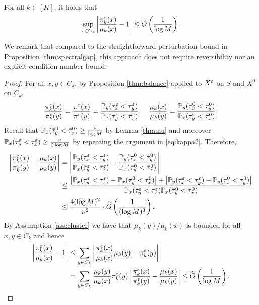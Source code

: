 \begin{cor}\label{thm:pimu}
For all $k\in[K]$, it holds that
\begin{equation*}
\sup_{x\in C_k} \left\lvert\frac{\pi_k^\varepsilon(x)}{\mu_k(x)} - 1\right\rvert\le \widetilde{O}\left(\frac{1}{\log M}\right).
\end{equation*}
\end{cor}
We remark that compared to the straightforward perturbation bound in Proposition \ref{thm:spectralgap}, this approach does not require reversibility nor an explicit condition number bound.
\begin{proof}
For all $x,y\in C_k$, by Proposition \ref{thm:balance} applied to $X^\varepsilon$ on $S$ and $X^0$ on $C_k$,
\begin{equation*}
\frac{\pi_k^\varepsilon(x)}{\pi_k^\varepsilon(y)} = \frac{\pi^\varepsilon(x)}{\pi^\varepsilon(y)} = \frac{\mathbb{P}_y(\bar{\tau}_x^\varepsilon<\bar{\tau}_y^\varepsilon)}{\mathbb{P}_x(\bar{\tau}_y^\varepsilon<\bar{\tau}_x^\varepsilon)},\quad \frac{\mu_k(x)}{\mu_k(y)} = \frac{\mathbb{P}_y(\bar{\tau}_x^0<\bar{\tau}_y^0)}{\mathbb{P}_x(\bar{\tau}_y^0<\bar{\tau}_x^0)}.
\end{equation*}
Recall that $\mathbb{P}_x(\bar{\tau}_y^0<\bar{\tau}_x^0) \ge \frac{\nu}{\log M}$ by Lemma \ref{thm:nu} and moreover $\mathbb{P}_x(\bar{\tau}_y^\varepsilon<\bar{\tau}_x^\varepsilon) \ge\frac{\nu}{2\log M}$ by repeating the argument in \eqref{eq:kappa2}. Therefore,
\begin{align*}
\left\lvert\frac{\pi_k^\varepsilon(x)}{\pi_k^\varepsilon(y)} - \frac{\mu_k(x)}{\mu_k(y)}\right\rvert &= \left\lvert\frac{\mathbb{P}_y(\bar{\tau}_x^\varepsilon<\bar{\tau}_y^\varepsilon)}{\mathbb{P}_x(\bar{\tau}_y^\varepsilon<\bar{\tau}_x^\varepsilon)} - \frac{\mathbb{P}_y(\bar{\tau}_x^0<\bar{\tau}_y^0)}{\mathbb{P}_x(\bar{\tau}_y^0<\bar{\tau}_x^0)}\right\rvert \\
&\le \frac{\left\lvert\mathbb{P}_x(\bar{\tau}_y^\varepsilon<\bar{\tau}_x^\varepsilon) - \mathbb{P}_x(\bar{\tau}_y^0<\bar{\tau}_x^0)\right\rvert +\left\lvert\mathbb{P}_y(\bar{\tau}_x^\varepsilon<\bar{\tau}_y^\varepsilon) - \mathbb{P}_y(\bar{\tau}_x^0<\bar{\tau}_y^0)\right\rvert}{\mathbb{P}_x(\bar{\tau}_y^\varepsilon<\bar{\tau}_x^\varepsilon) \mathbb{P}_x(\bar{\tau}_y^0<\bar{\tau}_x^0)} \\
&\le \frac{4(\log M)^2}{\nu^2}\cdot \widetilde{O}\left(\frac{1}{(\log M)^3}\right).
\end{align*}
By Assumption \ref{ass:cluster} we have that $\mu_k(y)/\mu_k(x)$ is bounded for all $x,y\in C_k$ and hence
\begin{align*}
\left\lvert\frac{\pi_k^\varepsilon(x)}{\mu_k(x)} - 1\right\rvert &\le \sum_{y\in C_k} \left\lvert\frac{\pi_k^\varepsilon(x)}{\mu_k(x)}\mu_k(y) - \pi_k^\varepsilon(y)\right\rvert \\
&= \sum_{y\in C_k} \frac{\mu_k(y)}{\mu_k(x)}\pi_k^\varepsilon(y) \left\lvert\frac{\pi_k^\varepsilon(x)}{\pi_k^\varepsilon(y)} - \frac{\mu_k(x)}{\mu_k(y)}\right\rvert \le \widetilde{O}\left(\frac{1}{\log M}\right).
\end{align*}
\end{proof}

